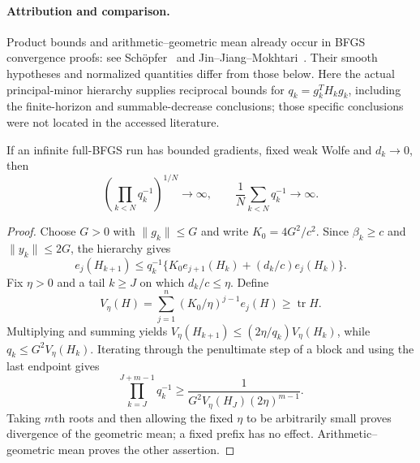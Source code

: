 \paragraph{Attribution and comparison.}
Product bounds and arithmetic--geometric mean already occur in BFGS convergence proofs: see Sch\"opfer~\cite[proof of Theorem~3.7]{S16} and Jin--Jiang--Mokhtari~\cite[Appendices C--D]{FND_JJM24AW}. Their smooth hypotheses and normalized quantities differ from those below. Here the actual principal-minor hierarchy supplies reciprocal bounds for $q_k=g_k^TH_kg_k$, including the finite-horizon and summable-decrease conclusions; those specific conclusions were not located in the accessed literature.

\begin{theorem}\label{M:average}
If an infinite full-BFGS run has bounded gradients, fixed weak Wolfe and $d_k\to0$, then
\[
 \left(\prod_{k<N}q_k^{-1}\right)^{1/N}\to\infty,
 \qquad\frac1N\sum_{k<N}q_k^{-1}\to\infty.
\]
\end{theorem}
\begin{proof}
Choose $G>0$ with $\|g_k\|\le G$ and write $K_0=4G^2/c^2$. Since $\beta_k\ge c$ and $\|y_k\|\le2G$, the hierarchy gives
\[
 e_j(H_{k+1})\le q_k^{-1}\{K_0 e_{j+1}(H_k)+(d_k/c)e_j(H_k)\}.
\]
Fix $\eta>0$ and a tail $k\ge J$ on which $d_k/c\le\eta$. Define
\[
 V_\eta(H)=\sum_{j=1}^n(K_0/\eta)^{j-1}e_j(H)\ge\operatorname{tr}H.
\]
Multiplying and summing yields $V_\eta(H_{k+1})\le(2\eta/q_k)V_\eta(H_k)$, while $q_k\le G^2V_\eta(H_k)$. Iterating through the penultimate step of a block and using the last endpoint gives
\[
 \prod_{k=J}^{J+m-1}q_k^{-1}\ge\frac1{G^2V_\eta(H_J)(2\eta)^{m-1}}.
\]
Taking $m$th roots and then allowing the fixed $\eta$ to be arbitrarily small proves divergence of the geometric mean; a fixed prefix has no effect. Arithmetic--geometric mean proves the other assertion.
\end{proof}

